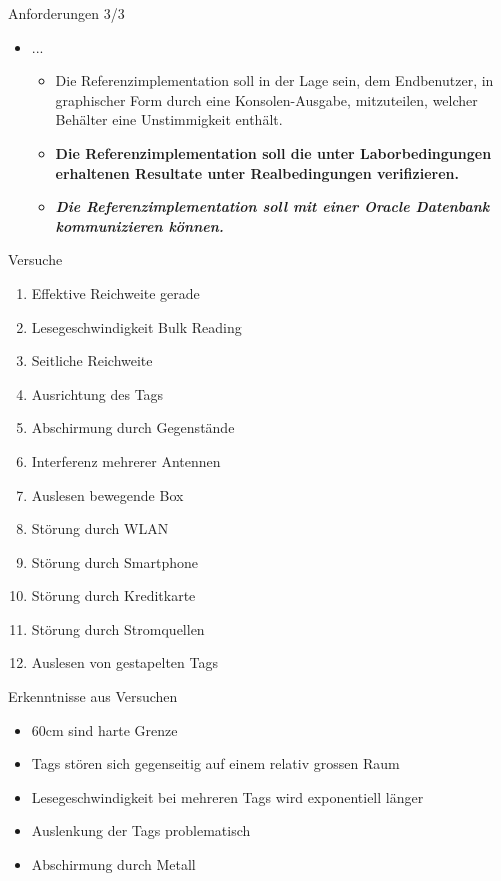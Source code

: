 \documentclass{beamer}
\begin{document}
\begin{frame}{Anforderungen 3/3}
\begin{itemize}
    \item ...
    \begin{itemize}
        \item Die Referenzimplementation soll in der Lage sein, dem Endbenutzer, in graphischer Form durch eine Konsolen-Ausgabe, mitzuteilen, welcher Behälter eine Unstimmigkeit enthält.
        \item \textbf{Die Referenzimplementation soll die unter Laborbedingungen erhaltenen Resultate unter Realbedingungen verifizieren.}
        \item \textbf{\textit{Die Referenzimplementation soll mit einer Oracle Datenbank kommunizieren können.}}
    \end{itemize}
 \end{itemize}
\end{frame}
\begin{frame}{Versuche}
\begin{enumerate}
    \item Effektive Reichweite gerade
    \item Lesegeschwindigkeit Bulk Reading
    \item Seitliche Reichweite
    \item Ausrichtung des Tags
    \item Abschirmung durch Gegenstände
    \item Interferenz mehrerer Antennen
    \item Auslesen bewegende Box
    \item Störung durch WLAN
    \item Störung durch Smartphone
    \item Störung durch Kreditkarte
    \item Störung durch Stromquellen
    \item Auslesen von gestapelten Tags
\end{enumerate}
\end{frame}
\begin{frame}{Erkenntnisse aus Versuchen}
\begin{itemize}
    \item 60cm sind harte Grenze
    \item Tags stören sich gegenseitig auf einem relativ grossen Raum
    \item Lesegeschwindigkeit bei mehreren Tags wird exponentiell länger
    \item Auslenkung der Tags problematisch
    \item Abschirmung durch Metall
\end{itemize}
\end{frame}
\end{document}
